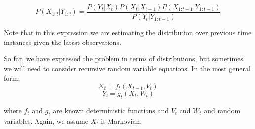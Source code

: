 \begin{equation}
P(X_{1:t}|Y_{1:t}) = \frac{P(Y_t|X_t)P(X_t|X_{t-1})P(X_{1:t-1}|Y_{1:t-1})}{P(Y_t|Y_{1:t-1})}
\label{eq:JointSeqBayesRule}
\end{equation}

Note that in this expression we are estimating the distribution over previous time instances given the latest observations.

So far, we have expressed the problem in terms of distributions, but sometimes we will need to consider recursive random variable equations. In the most general form:
\begin{equation}
X_t = f_t(X_{t-1}, V_t)
\label{eq:FilterEq1}
\end{equation}
\begin{equation}
Y_t = g_t(X_t, W_t)
\label{eq:FilterEq2}
\end{equation}

where $f_t$ and $g_t$ are known deterministic functions and $V_t$ and $W_t$ and random variables. Again, we assume $X_t$ is Markovian.